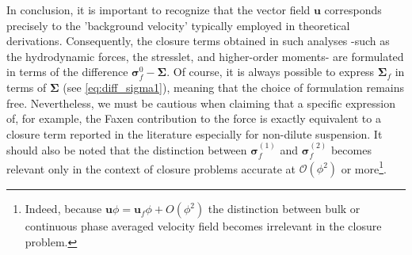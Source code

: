 In conclusion, it is important to recognize that the vector field \(\textbf{u}\) corresponds precisely to the 'background velocity' typically employed in theoretical derivations. 
Consequently, the closure terms obtained in such analyses -such as the hydrodynamic forces, the stresslet, and higher-order moments- are formulated in terms of the difference \(\bm\sigma_f^0 - \bm\Sigma\).
Of course, it is always possible to express \(\bm\Sigma_f\) in terms of \(\bm\Sigma\) (see \ref{eq:diff_sigma1}), meaning that the choice of formulation remains free. 
Nevertheless, we must be cautious when claiming that a specific expression of, for example, the Faxen contribution to the force is exactly equivalent to a closure term reported in the literature especially for non-dilute suspension. 
It should also be noted that the distinction between $\bm\sigma_f^{(1)}$ and $\bm\sigma_f^{(2)}$ becomes relevant only in the context of closure problems accurate at \(\mathcal{O}(\phi^2)\) or more\footnote{Indeed, because $\textbf{u} \phi = \textbf{u}_f\phi +O(\phi^2)$ the distinction between bulk or continuous phase averaged velocity field becomes irrelevant in the closure problem. }. 

